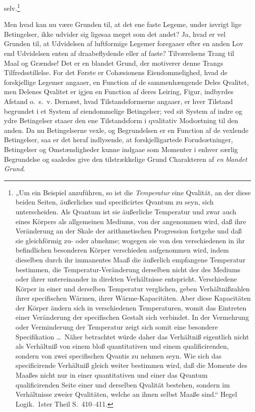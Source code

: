 \documentclass[12pt]{book}
\newcommand{\opage}[1]{\marginnote{\footnotesize\textit{[#1]}}}
\begin{document}
selv.\footnote{„Um ein Beispiel anzuführen, so ist die \emph{Temperatur} eine Qvalität, an der diese
beiden Seiten, äußerliches und specificirtes Qvantum zu seyn, sich unterscheiden. Als Qvantum ist sie
äußerliche Temperatur und zwar auch eines Körpers als allgemeinen Mediums, von der angenommen wird, daß
ihre Veränderung an der Skale der arithmetischen Progression fortgehe und daß sie gleichförmig zu- oder
abnehme; wogegen sie von den verschiedenen in ihr befindlichen besonderen Körper verschieden aufgenommen
wird, indem dieselben durch ihr immanentes Maaß die äußerlich empfangene Temperatur bestimmen, die
Temperatur-Veränderung derselben nicht der des Mediums oder ihrer untereinander in direkten Verhältnisse
entspricht. Verschiedene Körper in einer und derselben Temperatur verglichen, geben Verhältnißzahlen
ihrer specifischen Wärmen, ihrer Wärme-Kapacitäten. Aber diese Kapacitäten der Körper ändern sich in
verschiedenen Temperaturen, womit das Eintreten einer Veränderung der specifischen Gestalt sich
verbindet. In der Vermehrung oder Verminderung der Temperatur zeigt sich somit eine besondere
Specifikation \ldots\ Näher betrachtet würde daher das Verhältniß eigentlich nicht als Verhältniß von
einem bloß quantitativen und einem qualificirenden, sondern von zwei specifischen Qvantis zu nehmen
seyn. Wie sich das specificirende Verhältniß gleich weiter bestimmen wird, daß die Momente des Maaßes
nicht nur in einer quantitativen und einer das Qvantum qualificirenden Seite einer und derselben Qvalität
bestehen, sondern im Verhältnisse zweier Qvalitäten, welche an ihnen selbst Maaße sind.“ Hegel Logik.\
1ster Theil S.~410--411.}

Men hvad kan nu være Grunden til, at det ene faste Legeme, under iøvrigt lige Betingelser, ikke udvider
sig ligesaa meget som det andet? Ja, hvad er vel Grunden til, at Udvidelsen af luftformige Legemer
foregaaer efter en anden Lov end Udvidelsen enten af draabeflydende eller af faste? Tilværelsens Trang
til Maal og Grændse! Det er en blandet Grund, der motiverer denne Trangs Tilfredsstillelse. For
\opage{321} det Første er Cohæsionens Eiendommelighed, hvad de forskjellige Legemer angaaer, en
Function af de sammenhængende Deles Qvalitet, men Delenes Qvalitet er igjen en
Function af deres Leiring, Figur, indbyrdes Afstand o.\ s.\ v. Dernæst, hvad
Tilstandsformerne angaaer, er hver Tilstand begrundet i et System af eiendommelige
Betingelser; ved sit System af indre og ydre Betingelser staaer den ene
Tilstandsform i qvalitativ Modsætning til den anden. Da nu Betingelserne vexle, og
Begrundelsen er en Function af de vexlende Betingelser, saa er det heraf indlysende,
at forskjelligartede Forudsætninger, Betingelser og Omstændigheder kunne indgaae som
Momenter i enhver særlig Begrundelse og saaledes give den tilstrækkelige Grund
Charakteren af \emph{en blandet Grund}.
\end{document}
